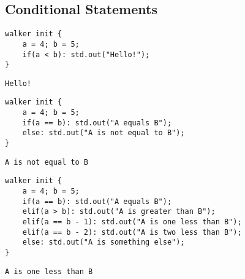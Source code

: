 \subsection*{Conditional Statements}
\begin{description}
    \begin{lstlisting}[caption={\texttt{if} statements}]
walker init {
    a = 4; b = 5;
    if(a < b): std.out("Hello!");
}
    \end{lstlisting}
    \item[Output] \texttt{}
          \begin{lstlisting}[language=shell]
Hello!
        \end{lstlisting}
    \item[Description] \texttt{}
\end{description}

\begin{description}
    \begin{lstlisting}[caption={\texttt{else} statement}]
walker init {
    a = 4; b = 5;
    if(a == b): std.out("A equals B");
    else: std.out("A is not equal to B");
}
    \end{lstlisting}
    \item[Output] \texttt{}
          \begin{lstlisting}[language=shell]
A is not equal to B
        \end{lstlisting}
    \item[Description] \texttt{}
\end{description}

\begin{description}
    \begin{lstlisting}[caption={\texttt{elif} statement}]
walker init {
    a = 4; b = 5;
    if(a == b): std.out("A equals B");
    elif(a > b): std.out("A is greater than B");
    elif(a == b - 1): std.out("A is one less than B");
    elif(a == b - 2): std.out("A is two less than B");
    else: std.out("A is something else");
}
    \end{lstlisting}
    \item[Output] \texttt{}
          \begin{lstlisting}[language=shell]
A is one less than B
        \end{lstlisting}
    \item[Description] \texttt{}
\end{description}


